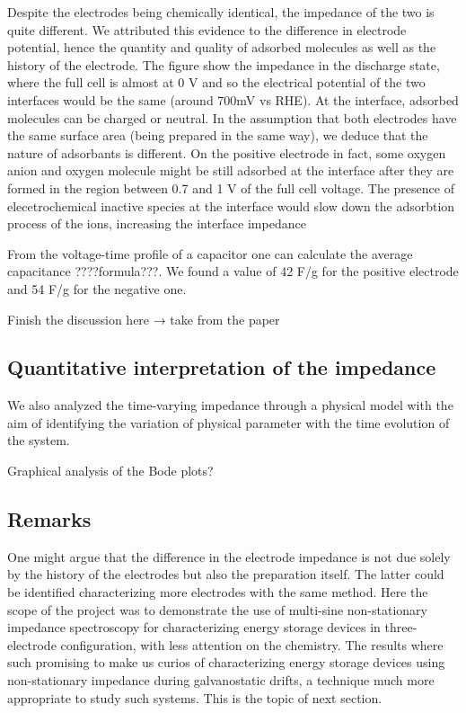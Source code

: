 Despite the electrodes being chemically identical, the impedance of the two is quite different. We attributed this evidence to the difference in electrode potential, hence the quantity and quality of adsorbed molecules as well as the history of the electrode. The figure show the impedance in the discharge state, where the full cell is almost at 0 V and so the electrical potential of the two interfaces would be the same (around 700mV vs RHE). At the interface, adsorbed molecules can be charged or neutral. In the assumption that both electrodes have the same surface area (being prepared in the same way), we deduce that the nature of adsorbants is different. On the positive electrode in fact, some oxygen anion and oxygen molecule might be still adsorbed at the interface after they are formed in the region between 0.7 and 1 V of the full cell voltage. The presence of elecetrochemical inactive species at the interface would slow down the adsorbtion process of the ions, increasing the interface impedance

From the voltage-time profile of a capacitor one can calculate the average capacitance ????formula???. We found a value of 42 F/g for the positive electrode and 54 F/g for the negative one.

\colorbox{BurntOrange}{Finish the discussion here → take from the paper}

\subsection{Quantitative interpretation of the impedance}

We also analyzed the time-varying impedance through a physical model with the aim of identifying the variation of physical parameter with the time evolution of the system. 

Graphical analysis of the Bode plots?

\subsection{Remarks}

One might argue that the difference in the electrode impedance is not due solely by the history of the electrodes but also the preparation itself. The latter could be identified characterizing more electrodes with the same method. Here the scope of the project was to demonstrate the use of multi-sine non-stationary impedance spectroscopy for characterizing energy storage devices in three-electrode configuration, with less attention on the chemistry. The results where such promising to make us curios of characterizing energy storage devices using non-stationary impedance during galvanostatic drifts, a technique much more appropriate to study such systems. This is the topic of next section.